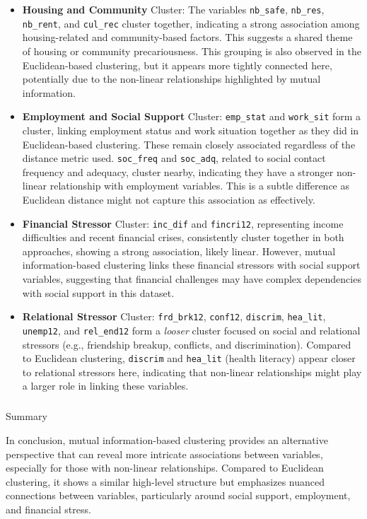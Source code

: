 \documentclass[
]{article}
\makeatletter
\let\oldsubparagraph\subparagraph
\renewcommand{\subparagraph}{
    \@ifstar
      \xxxSubParagraphStar
      \xxxSubParagraphNoStar
  }
\newcommand{\xxxSubParagraphStar}[1]{\oldsubparagraph*{#1}\mbox{}}
\newcommand{\xxxSubParagraphNoStar}[1]{\oldsubparagraph{#1}\mbox{}}
\makeatother
\begin{document}
\begin{itemize}
\item
  \textbf{Housing and Community} Cluster: The variables
  \texttt{nb\_safe}, \texttt{nb\_res}, \texttt{nb\_rent}, and
  \texttt{cul\_rec} cluster together, indicating a strong association
  among housing-related and community-based factors. This suggests a
  shared theme of housing or community precariousness. This grouping is
  also observed in the Euclidean-based clustering, but it appears more
  tightly connected here, potentially due to the non-linear
  relationships highlighted by mutual information.
\item
  \textbf{Employment and Social Support} Cluster: \texttt{emp\_stat} and
  \texttt{work\_sit} form a cluster, linking employment status and work
  situation together as they did in Euclidean-based clustering. These
  remain closely associated regardless of the distance metric used.
  \texttt{soc\_freq} and \texttt{soc\_adq}, related to social contact
  frequency and adequacy, cluster nearby, indicating they have a
  stronger non-linear relationship with employment variables. This is a
  subtle difference as Euclidean distance might not capture this
  association as effectively.
\item
  \textbf{Financial Stressor} Cluster: \texttt{inc\_dif} and
  \texttt{fincri12}, representing income difficulties and recent
  financial crises, consistently cluster together in both approaches,
  showing a strong association, likely linear. However, mutual
  information-based clustering links these financial stressors with
  social support variables, suggesting that financial challenges may
  have complex dependencies with social support in this dataset.
\item
  \textbf{Relational Stressor} Cluster: \texttt{frd\_brk12},
  \texttt{conf12}, \texttt{discrim}, \texttt{hea\_lit},
  \texttt{unemp12}, and \texttt{rel\_end12} form a \emph{looser} cluster
  focused on social and relational stressors (e.g., friendship breakup,
  conflicts, and discrimination). Compared to Euclidean clustering,
  \texttt{discrim} and \texttt{hea\_lit} (health literacy) appear closer
  to relational stressors here, indicating that non-linear relationships
  might play a larger role in linking these variables.
\end{itemize}

\subparagraph{Summary}\label{summary-2}

In conclusion, mutual information-based clustering provides an
alternative perspective that can reveal more intricate associations
between variables, especially for those with non-linear relationships.
Compared to Euclidean clustering, it shows a similar high-level
structure but emphasizes nuanced connections between variables,
particularly around social support, employment, and financial stress.
\end{document}
